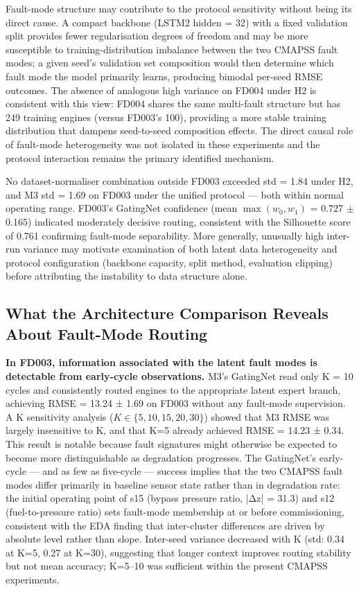\documentclass[preprint,10pt]{elsarticle}
\begin{document}
Fault-mode structure may contribute to the protocol sensitivity without being its direct cause. A compact backbone (LSTM2 hidden = 32) with a fixed validation split provides fewer regularisation degrees of freedom and may be more susceptible to training-distribution imbalance between the two CMAPSS fault modes; a given seed's validation set composition would then determine which fault mode the model primarily learns, producing bimodal per-seed RMSE outcomes. The absence of analogous high variance on FD004 under H2 is consistent with this view: FD004 shares the same multi-fault structure but has 249 training engines (versus FD003's 100), providing a more stable training distribution that dampens seed-to-seed composition effects. The direct causal role of fault-mode heterogeneity was not isolated in these experiments and the protocol interaction remains the primary identified mechanism.

No dataset-normaliser combination outside FD003 exceeded std = 1.84 under H2, and M3 std = 1.69 on FD003 under the unified protocol --- both within normal operating range. FD003's GatingNet confidence (mean $\max(w_0, w_1)$ = 0.727 $\pm$ 0.165) indicated moderately decisive routing, consistent with the Silhouette score of 0.761 confirming fault-mode separability. More generally, unusually high inter-run variance may motivate examination of both latent data heterogeneity and protocol configuration (backbone capacity, split method, evaluation clipping) before attributing the instability to data structure alone.

\subsection{What the Architecture Comparison Reveals About Fault-Mode Routing}

\textbf{In FD003, information associated with the latent fault modes is detectable from early-cycle observations.} M3's GatingNet read only K = 10 cycles and consistently routed engines to the appropriate latent expert branch, achieving RMSE = 13.24 ± 1.69 on FD003 without any fault-mode supervision. A K sensitivity analysis ($K \in \{5, 10, 15, 20, 30\}$) showed that M3 RMSE was largely insensitive to K, and that K=5 already achieved RMSE = 14.23 ± 0.34. This result is notable because fault signatures might otherwise be expected to become more distinguishable as degradation progresses. The GatingNet's early-cycle — and as few as five-cycle — success implies that the two CMAPSS fault modes differ primarily in baseline sensor state rather than in degradation rate: the initial operating point of s15 (bypass pressure ratio, |Δz| = 31.3) and s12 (fuel-to-pressure ratio) sets fault-mode membership at or before commissioning, consistent with the EDA finding that inter-cluster differences are driven by absolute level rather than slope. Inter-seed variance decreased with K (std: 0.34 at K=5, 0.27 at K=30), suggesting that longer context improves routing stability but not mean accuracy; K=5--10 was sufficient within the present CMAPSS experiments.
\end{document}
